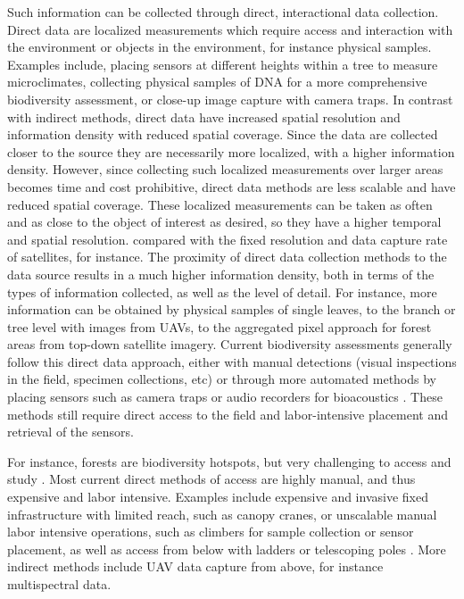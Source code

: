 


Such information can be collected through direct, interactional data collection. Direct data are localized measurements which require access and interaction with the environment or objects in the environment, for instance physical samples. Examples include, placing sensors at different heights within a tree to measure microclimates, collecting physical samples of DNA for a more comprehensive biodiversity assessment, or close-up image capture with camera traps. In contrast with indirect methods, direct data have increased spatial resolution and information density with reduced spatial coverage. Since the data are collected closer to the source they are necessarily more localized, with a higher information density. However, since collecting such localized measurements over larger areas becomes time and cost prohibitive, direct data methods are less scalable and have reduced spatial coverage. These localized measurements can be taken as often and as close to the object of interest as desired, so  they have a higher temporal and spatial resolution. compared with the fixed resolution and data capture rate of satellites, for instance. The proximity of direct data collection methods to the data source results in a much higher information density, both in terms of the types of information collected, as well as the level of detail. For instance, more information can be obtained by physical samples of single leaves, to the branch or tree level with images from UAVs, to the aggregated pixel approach for forest areas from top-down satellite imagery.
Current biodiversity assessments generally follow this direct data approach, either with manual detections (visual inspections in the field, specimen collections, etc) or through more automated methods by placing sensors such as camera traps or audio recorders for bioacoustics \cite{}. These methods still require direct access to the field and labor-intensive placement and retrieval of the sensors.


For instance, forests are biodiversity hotspots, but very challenging to access and study \cite{Pillay2022, Ozanne2003d, }. Most current direct methods of access are highly manual, and thus expensive and labor intensive. Examples include expensive and invasive fixed infrastructure with limited reach, such as canopy cranes, or unscalable manual labor intensive operations, such as climbers for sample collection or sensor placement, as well as access from below with ladders or telescoping poles \cite{Cannon2021}. 
More indirect methods include UAV data capture from above, for instance multispectral data.

